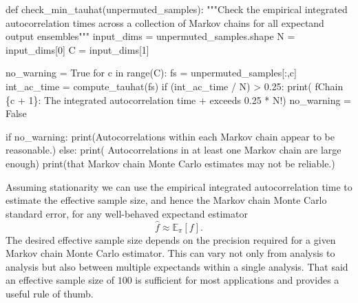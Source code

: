 \documentclass[
  letterpaper,
  DIV=11,
  numbers=noendperiod]{scrartcl}
\newenvironment{Shaded}{\begin{snugshade}}{\end{snugshade}}
\newcommand{\BuiltInTok}[1]{\textcolor[rgb]{0.00,0.23,0.31}{#1}}
\newcommand{\CommentTok}[1]{\textcolor[rgb]{0.37,0.37,0.37}{#1}}
\newcommand{\ControlFlowTok}[1]{\textcolor[rgb]{0.00,0.23,0.31}{#1}}
\newcommand{\DecValTok}[1]{\textcolor[rgb]{0.68,0.00,0.00}{#1}}
\newcommand{\FloatTok}[1]{\textcolor[rgb]{0.68,0.00,0.00}{#1}}
\newcommand{\KeywordTok}[1]{\textcolor[rgb]{0.00,0.23,0.31}{#1}}
\newcommand{\NormalTok}[1]{\textcolor[rgb]{0.00,0.23,0.31}{#1}}
\newcommand{\OperatorTok}[1]{\textcolor[rgb]{0.37,0.37,0.37}{#1}}
\newcommand{\SpecialCharTok}[1]{\textcolor[rgb]{0.37,0.37,0.37}{#1}}
\newcommand{\SpecialStringTok}[1]{\textcolor[rgb]{0.13,0.47,0.30}{#1}}
\newcommand{\StringTok}[1]{\textcolor[rgb]{0.13,0.47,0.30}{#1}}
\newcommand{\VariableTok}[1]{\textcolor[rgb]{0.07,0.07,0.07}{#1}}
\begin{document}
\begin{Shaded}
\begin{Highlighting}[]
\KeywordTok{def}\NormalTok{ check\_min\_tauhat(unpermuted\_samples):}
  \CommentTok{"""Check the empirical integrated autocorrelation times across a }
\CommentTok{     collection of Markov chains for all expectand output ensembles"""}
\NormalTok{  input\_dims }\OperatorTok{=}\NormalTok{ unpermuted\_samples.shape}
\NormalTok{  N }\OperatorTok{=}\NormalTok{ input\_dims[}\DecValTok{0}\NormalTok{]}
\NormalTok{  C }\OperatorTok{=}\NormalTok{ input\_dims[}\DecValTok{1}\NormalTok{]}
    
\NormalTok{  no\_warning }\OperatorTok{=} \VariableTok{True}
  \ControlFlowTok{for}\NormalTok{ c }\KeywordTok{in} \BuiltInTok{range}\NormalTok{(C):}
\NormalTok{    fs }\OperatorTok{=}\NormalTok{ unpermuted\_samples[:,c]}
\NormalTok{    int\_ac\_time }\OperatorTok{=}\NormalTok{ compute\_tauhat(fs)}
    \ControlFlowTok{if}\NormalTok{ (int\_ac\_time }\OperatorTok{/}\NormalTok{ N) }\OperatorTok{\textgreater{}} \FloatTok{0.25}\NormalTok{:}
      \BuiltInTok{print}\NormalTok{(  }\SpecialStringTok{f\textquotesingle{}Chain }\SpecialCharTok{\{}\NormalTok{c }\OperatorTok{+} \DecValTok{1}\SpecialCharTok{\}}\SpecialStringTok{: The integrated autocorrelation time\textquotesingle{}}
            \OperatorTok{+} \StringTok{\textquotesingle{}exceeds 0.25 * N!\textquotesingle{}}\NormalTok{)}
\NormalTok{      no\_warning }\OperatorTok{=} \VariableTok{False}
  
  \ControlFlowTok{if}\NormalTok{ no\_warning:}
    \BuiltInTok{print}\NormalTok{(}\StringTok{\textquotesingle{}Autocorrelations within each Markov chain appear to be reasonable.\textquotesingle{}}\NormalTok{)}
  \ControlFlowTok{else}\NormalTok{:}
    \BuiltInTok{print}\NormalTok{(}\StringTok{\textquotesingle{}  Autocorrelations in at least one Markov chain are large enough\textquotesingle{}}\NormalTok{)}
    \BuiltInTok{print}\NormalTok{(}\StringTok{\textquotesingle{}that Markov chain Monte Carlo estimates may not be reliable.\textquotesingle{}}\NormalTok{)}
\end{Highlighting}
\end{Shaded}

Assuming stationarity we can use the empirical integrated
autocorrelation time to estimate the effective sample size, and hence
the Markov chain Monte Carlo standard error, for any well-behaved
expectand estimator \[
\hat{f} \approx \mathbb{E}_{\pi}[f].
\] The desired effective sample size depends on the precision required
for a given Markov chain Monte Carlo estimator. This can vary not only
from analysis to analysis but also between multiple expectands within a
single analysis. That said an effective sample size of \(100\) is
sufficient for most applications and provides a useful rule of thumb.
\end{document}
